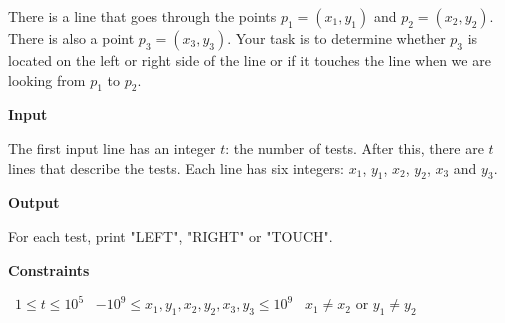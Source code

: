 There is a line that goes through the points $p_1=(x_1,y_1)$ and $p_2=(x_2,y_2)$. There is also a point $p_3=(x_3,y_3)$.
Your task is to determine whether $p_3$ is located on the left or right side of the line or if it touches the line when we are looking from $p_1$ to $p_2$.

\vspace{0.3cm}\noindent\textbf{Input}

The first input line has an integer $t$: the number of tests.
After this, there are $t$ lines that describe the tests. Each line has six integers: $x_1$, $y_1$, $x_2$, $y_2$, $x_3$ and $y_3$.

\vspace{0.3cm}\noindent\textbf{Output}

For each test, print "LEFT", "RIGHT" or "TOUCH".

\vspace{0.3cm}\noindent\textbf{Constraints}

\textbullet\ $1 \le t \le 10^5$
\textbullet\ $-10^9 \le x_1, y_1, x_2, y_2, x_3, y_3 \le 10^9$
\textbullet\ $x_1 \neq x_2$ or $y_1 \neq y_2$